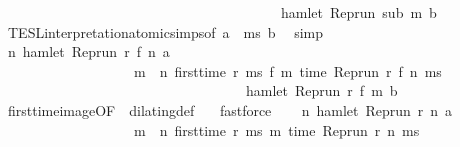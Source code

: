 \begin{isabellebody}
\ \ \ \ \ \ \ \ \ \ \ \ \ \ \ \ \ \ \ \ \ \ \ \ \ \ \ \ \ \ \ \ \ \ \ \ \ \ \ {\isasymlongrightarrow}\ hamlet\ {\isacharparenleft}{\isacharparenleft}Rep{\isacharunderscore}run\ sub{\isacharparenright}\ m\ b{\isacharparenright}{\isacharparenright}{\isacartoucheclose}\isanewline
\ \ \ \ \isamarkupfalse%
\ TESL{\isacharunderscore}interpretation{\isacharunderscore}atomic{\isachardot}simps{\isacharparenleft}{}{\isacharparenright}{\isacharbrackleft}of\ {\isacartoucheopen}a{\isacartoucheclose}\ {\isacartoucheopen}{\isasymdelta}{\isasymtau}{\isacartoucheclose}\ {\isacartoucheopen}ms{\isacartoucheclose}\ {\isacartoucheopen}b{\isacartoucheclose}{\isacharbrackright}\ \isamarkupfalse%
\ simp\isanewline
\ \ \isamarkupfalse%
\ {\isacharasterisk}{\isacharasterisk}{\isacharcolon}{\isacartoucheopen}{\isasymforall}n\ hamlet\ {\isacharparenleft}{\isacharparenleft}Rep{\isacharunderscore}run\ r{\isacharparenright}\ {\isacharparenleft}f\ n\ a{\isacharparenright}\isanewline
\ \ \ \ \ \ \ \ \ \ \ \ \ \ \ \ \ \ {\isasymlongrightarrow}\ {\isacharparenleft}{\isasymforall}m\ {\isasymge}\ n\ first{\isacharunderscore}time\ r\ ms\ {\isacharparenleft}f\ m\ {\isacharparenleft}time\ {\isacharparenleft}{\isacharparenleft}Rep{\isacharunderscore}run\ r{\isacharparenright}\ {\isacharparenleft}f\ n\ ms{\isacharparenright}\ {\isacharplus}\ {\isasymdelta}{\isasymtau}{\isacharparenright}\isanewline
\ \ \ \ \ \ \ \ \ \ \ \ \ \ \ \ \ \ \ \ \ \ \ \ \ \ \ \ \ \ \ \ \ \ {\isasymlongrightarrow}\ hamlet\ {\isacharparenleft}{\isacharparenleft}Rep{\isacharunderscore}run\ r{\isacharparenright}\ {\isacharparenleft}f\ m\ b{\isacharparenright}{\isacharparenright}\ \ {\isacartoucheclose}\isanewline
\ \ \ \ \isamarkupfalse%
\ first{\isacharunderscore}time{\isacharunderscore}image{\isacharbrackleft}OF\ {\isacharasterisk}{\isacharbrackright}\ dilating{\isacharunderscore}def\ {\isacharasterisk}\ \isamarkupfalse%
\ fastforce\isanewline
\ \ \isamarkupfalse%
\ {\isacartoucheopen}{\isasymforall}n{\isachardot}\ hamlet\ {\isacharparenleft}{\isacharparenleft}Rep{\isacharunderscore}run\ r{\isacharparenright}\ n\ a{\isacharparenright}\isanewline
\ \ \ \ \ \ \ \ \ \ \ \ \ \ \ \ \ \ {\isasymlongrightarrow}\ {\isacharparenleft}{\isasymforall}m\ {\isasymge}\ n{\isachardot}\ first{\isacharunderscore}time\ r\ ms\ m\ {\isacharparenleft}time\ {\isacharparenleft}{\isacharparenleft}Rep{\isacharunderscore}run\ r{\isacharparenright}\ n\ ms{\isacharparenright}\ {\isacharplus}\ {\isasymdelta}{\isasymtau}{\isacharparenright}\isanewline

\end{isabellebody}
